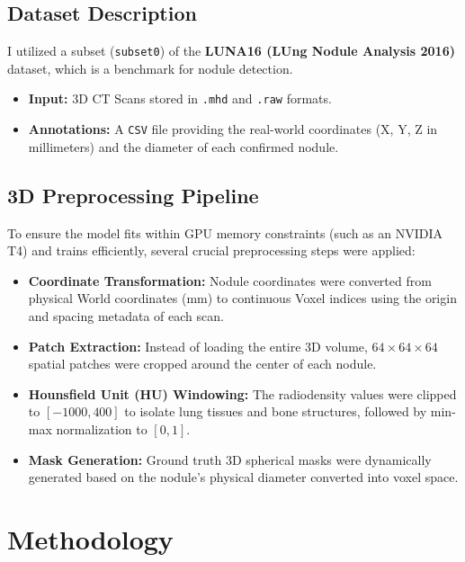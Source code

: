 \documentclass[conference]{IEEEtran}
\begin{document}
\subsection{Dataset Description}
I utilized a subset (\texttt{subset0}) of the \textbf{LUNA16 (LUng Nodule Analysis 2016)} dataset, which is a benchmark for nodule detection.
\begin{itemize}
    \item \textbf{Input:} 3D CT Scans stored in \texttt{.mhd} and \texttt{.raw} formats.
    \item \textbf{Annotations:} A \texttt{CSV} file providing the real-world coordinates (X, Y, Z in millimeters) and the diameter of each confirmed nodule.
\end{itemize}

\subsection{3D Preprocessing Pipeline}
To ensure the model fits within GPU memory constraints (such as an NVIDIA T4) and trains efficiently, several crucial preprocessing steps were applied:
\begin{itemize}
    \item \textbf{Coordinate Transformation:} Nodule coordinates were converted from physical World coordinates (mm) to continuous Voxel indices using the origin and spacing metadata of each scan.
    \item \textbf{Patch Extraction:} Instead of loading the entire 3D volume, $64 \times 64 \times 64$ spatial patches were cropped around the center of each nodule.
    \item \textbf{Hounsfield Unit (HU) Windowing:} The radiodensity values were clipped to $[-1000, 400]$ to isolate lung tissues and bone structures, followed by min-max normalization to $[0, 1]$.
    \item \textbf{Mask Generation:} Ground truth 3D spherical masks were dynamically generated based on the nodule's physical diameter converted into voxel space.
\end{itemize}

\section{Methodology}
\end{document}
